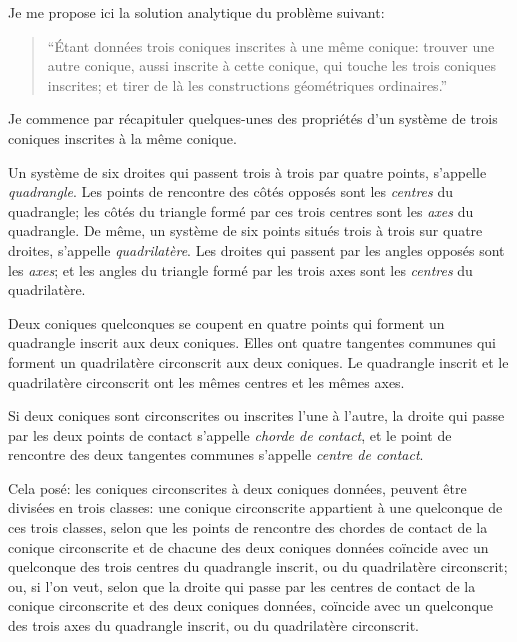 \documentclass[11pt,a4paper]{book}
\begin{document}
Je me propose ici la solution analytique du probl\`{e}me suivant:
\begin{quote}
``\'{E}tant donn\'{e}es trois coniques inscrites \`{a} une m\^{e}me conique: trouver une autre conique, aussi inscrite \`{a} cette conique, qui touche les trois coniques inscrites; et tirer de l\`{a} les constructions g\'{e}om\'{e}triques ordinaires.''
\end{quote}

Je commence par r\'{e}capituler quelques-unes des propri\'{e}t\'{e}s d'un syst\`{e}me de trois coniques inscrites \`{a} la m\^{e}me conique.

Un syst\`{e}me de six droites qui passent trois \`{a} trois par quatre points, s'appelle \emph{quadrangle}. Les points de rencontre des c\^{o}t\'{e}s oppos\'{e}s sont les \emph{centres} du quadrangle; les c\^{o}t\'{e}s du triangle form\'{e} par ces trois centres sont les \emph{axes} du quadrangle. De m\^{e}me, un syst\`{e}me de six points situ\'{e}s trois \`{a} trois sur quatre droites, s'appelle \emph{quadrilat\`{e}re}. Les droites qui passent par les angles oppos\'{e}s sont les \emph{axes}; et les angles du triangle form\'{e} par les trois axes sont les \emph{centres} du quadrilat\`{e}re.

Deux coniques quelconques se coupent en quatre points qui forment un quadrangle inscrit aux deux coniques. Elles ont quatre tangentes communes qui forment un quadrilat\`{e}re circonscrit aux deux coniques. Le quadrangle inscrit et le quadrilat\`{e}re circonscrit ont les m\^{e}mes centres et les m\^{e}mes axes.

Si deux coniques sont circonscrites ou inscrites l'une \`{a} l'autre, la droite qui passe par les deux points de contact s'appelle \emph{chorde de contact}, et le point de rencontre des deux tangentes communes s'appelle \emph{centre de contact}.

Cela pos\'{e}: les coniques circonscrites \`{a} deux coniques donn\'{e}es, peuvent \^{e}tre divis\'{e}es en trois classes: une conique circonscrite appartient \`{a} une quelconque de ces trois classes, selon que les points de rencontre des chordes de contact de la conique circonscrite et de chacune des deux coniques donn\'{e}es co\"{i}ncide avec un quelconque des trois centres du quadrangle inscrit, ou du quadrilat\`{e}re circonscrit; ou, si l'on veut, selon que la droite qui passe par les centres de contact de la conique circonscrite et des deux coniques donn\'{e}es, co\"{i}ncide avec un quelconque des trois axes du quadrangle inscrit, ou du quadrilat\`{e}re circonscrit.
\end{document}
